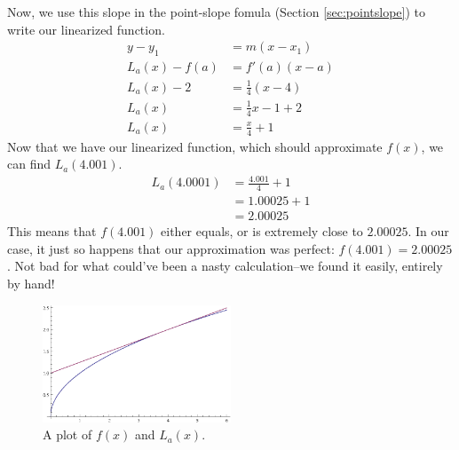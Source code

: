 \begin{ex}
\begin{sol}
    Now, we use this slope in the point-slope fomula (Section \ref{sec:pointslope}) to write our linearized function.
    \begin{align*}
      y-y_1 &= m (x-x_1) \\
      L_a(x)-f(a) &= f'(a) (x-a) \\
      L_a(x)-2 &= \frac{1}{4}(x-4) \\
      L_a(x) &= \frac{1}{4}x-1+2 \\
      L_a(x)&= \frac{x}{4}+1
    \end{align*}
    Now that we have our linearized function, which should approximate $f(x)$, we can find $L_a (4.001)$.
    \begin{align*}
      L_a(4.0001) &= \frac{4.001}{4}+1 \\
      &= 1.00025 +1 \\
      &= 2.00025
    \end{align*}
    This means that $f(4.001)$ either equals, or is extremely close to $2.00025$.
    In our case, it just so happens that our approximation was perfect: $f(4.001)=2.00025$.
    Not bad for what could've been a nasty calculation--we found it easily, entirely by hand!
    \begin{figure}[H]
      \begin{center}
        \includegraphics[width=0.5\textwidth]{continuous/derivatives/lin_ex1.eps}
      \end{center}
      \caption{A plot of $f(x)$ and $L_a(x)$.}
    \end{figure}
  \end{sol}
\end{ex}

